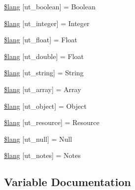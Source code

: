 \begin{DoxyCompactItemize}
\mbox{\hyperlink{unit__test__lang_8php_ad6ddfe645648dfbff37f400c198ecb1e}{\$lang}} \mbox{[}\textquotesingle{}ut\+\_\+boolean\textquotesingle{}\mbox{]} = \textquotesingle{}Boolean\textquotesingle{}
\item 
\mbox{\hyperlink{unit__test__lang_8php_ae2207197dd3d32f76d11c013d7166726}{\$lang}} \mbox{[}\textquotesingle{}ut\+\_\+integer\textquotesingle{}\mbox{]} = \textquotesingle{}Integer\textquotesingle{}
\item 
\mbox{\hyperlink{unit__test__lang_8php_af422c13e8dc0e7c45278a2013aa6a52a}{\$lang}} \mbox{[}\textquotesingle{}ut\+\_\+float\textquotesingle{}\mbox{]} = \textquotesingle{}Float\textquotesingle{}
\item 
\mbox{\hyperlink{unit__test__lang_8php_af34c0760602a4c8bb68970452fef8558}{\$lang}} \mbox{[}\textquotesingle{}ut\+\_\+double\textquotesingle{}\mbox{]} = \textquotesingle{}Float\textquotesingle{}
\item 
\mbox{\hyperlink{unit__test__lang_8php_ae8e448c917f05ad02b9796a5f7d0bc2d}{\$lang}} \mbox{[}\textquotesingle{}ut\+\_\+string\textquotesingle{}\mbox{]} = \textquotesingle{}String\textquotesingle{}
\item 
\mbox{\hyperlink{unit__test__lang_8php_a427e1ed9e9f885355a4fb12929245174}{\$lang}} \mbox{[}\textquotesingle{}ut\+\_\+array\textquotesingle{}\mbox{]} = \textquotesingle{}Array\textquotesingle{}
\item 
\mbox{\hyperlink{unit__test__lang_8php_af7a438e0124ac3a711af5942e52b757a}{\$lang}} \mbox{[}\textquotesingle{}ut\+\_\+object\textquotesingle{}\mbox{]} = \textquotesingle{}Object\textquotesingle{}
\item 
\mbox{\hyperlink{unit__test__lang_8php_aee89857218dd461be5741f7dceac4cda}{\$lang}} \mbox{[}\textquotesingle{}ut\+\_\+resource\textquotesingle{}\mbox{]} = \textquotesingle{}Resource\textquotesingle{}
\item 
\mbox{\hyperlink{unit__test__lang_8php_afb6ad5c6347afd6350e76a0e75f7bd76}{\$lang}} \mbox{[}\textquotesingle{}ut\+\_\+null\textquotesingle{}\mbox{]} = \textquotesingle{}Null\textquotesingle{}
\item 
\mbox{\hyperlink{unit__test__lang_8php_a0ccef0589600cd31d3a964c9f3721b20}{\$lang}} \mbox{[}\textquotesingle{}ut\+\_\+notes\textquotesingle{}\mbox{]} = \textquotesingle{}Notes\textquotesingle{}
\end{DoxyCompactItemize}


\subsection{Variable Documentation}
\mbox{\label{unit__test__lang_8php_a81799dc131f89840fd4ff4bc7c0afc94}} 
